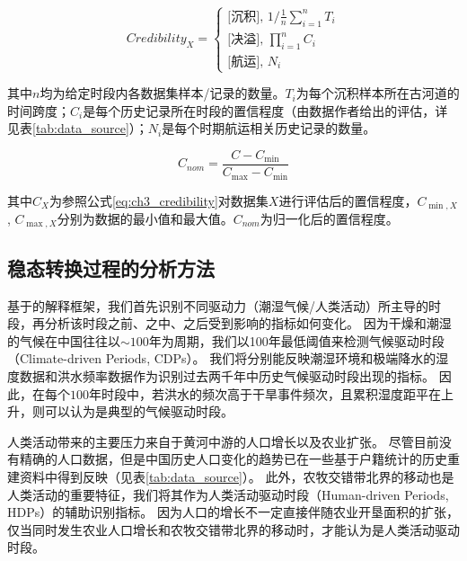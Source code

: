 

\begin{equation}
    \label{eq:ch3_credibility}
    Credibility_X = 
    \left\{\begin{array}{l}
        \text{[沉积], } 1 / \frac{1}{n} \sum_{i=1}^n T_i\\
        \text{[决溢], } \prod_{i=1}^n C_i\\
        \text{[航运], } N_i
    \end{array}\right.
\end{equation}

其中$n$均为给定时段内各数据集样本/记录的数量。$T_i$为每个沉积样本所在古河道的时间跨度；$C_i$是每个历史记录所在时段的置信程度（由数据作者给出的评估，详见表\ref{tab:data_source}）；$N_i$是每个时期航运相关历史记录的数量。

\begin{equation}
    \label{eq:ch3_normalize}
    C_{nom}=\frac{C-C_{\min}}{C_{\max}-C_{\min}}
\end{equation}

其中$C_{X}$为参照公式\ref{eq:ch3_credibility}对数据集$X$进行评估后的置信程度，$C_{\min, X}$, $C_{\max, X}$分别为数据的最小值和最大值。$C_{nom}$为归一化后的置信程度。

\subsection{稳态转换过程的分析方法}

基于的解释框架，我们首先识别不同驱动力（潮湿气候/人类活动）所主导的时段，再分析该时段之前、之中、之后受到影响的指标如何变化。
因为干燥和潮湿的气候在中国往往以$\sim100$年为周期\cite{GeQuanSheng2011}，我们以100年最低阈值来检测气候驱动时段（Climate-driven Periods, CDPs）。
我们将分别能反映潮湿环境和极端降水的湿度数据和洪水频率数据作为识别过去两千年中历史气候驱动时段出现的指标。
因此，在每个$100$年时段中，若洪水的频次高于干旱事件频次，且累积湿度距平在上升，则可以认为是典型的气候驱动时段。

人类活动带来的主要压力来自于黄河中游的人口增长以及农业扩张。
尽管目前没有精确的人口数据，但是中国历史人口变化的趋势已在一些基于户籍统计的历史重建资料中得到反映（见表\ref{tab:data_source}）。
此外，农牧交错带北界的移动也是人类活动的重要特征，我们将其作为人类活动驱动时段（Human-driven Periods, HDPs）的辅助识别指标。
因为人口的增长不一定直接伴随农业开垦面积的扩张，仅当同时发生农业人口增长和农牧交错带北界的移动时，才能认为是人类活动驱动时段。

